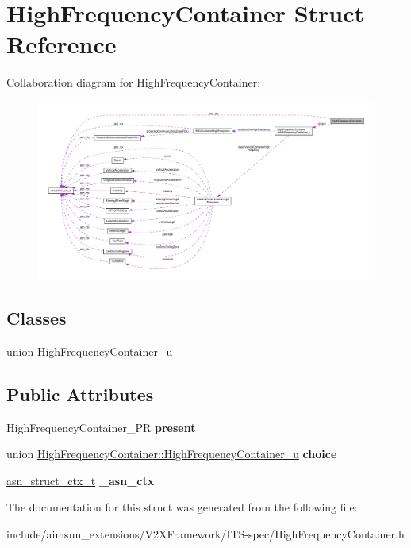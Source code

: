 \hypertarget{structHighFrequencyContainer}{}\section{High\+Frequency\+Container Struct Reference}
\label{structHighFrequencyContainer}


Collaboration diagram for High\+Frequency\+Container\+:\nopagebreak
\begin{figure}[H]
\begin{center}
\leavevmode
\includegraphics[width=350pt]{structHighFrequencyContainer__coll__graph}
\end{center}
\end{figure}
\subsection*{Classes}
\begin{DoxyCompactItemize}
\item 
union \hyperlink{unionHighFrequencyContainer_1_1HighFrequencyContainer__u}{High\+Frequency\+Container\+\_\+u}
\end{DoxyCompactItemize}
\subsection*{Public Attributes}
\begin{DoxyCompactItemize}
\item 
High\+Frequency\+Container\+\_\+\+PR {\bfseries present}\hypertarget{structHighFrequencyContainer_ab35711fed2e73729b8db6ff67d4d8174}{}\label{structHighFrequencyContainer_ab35711fed2e73729b8db6ff67d4d8174}

\item 
union \hyperlink{unionHighFrequencyContainer_1_1HighFrequencyContainer__u}{High\+Frequency\+Container\+::\+High\+Frequency\+Container\+\_\+u} {\bfseries choice}\hypertarget{structHighFrequencyContainer_a3a7eaa2ad0dce46808aad2d12301334a}{}\label{structHighFrequencyContainer_a3a7eaa2ad0dce46808aad2d12301334a}

\item 
\hyperlink{structasn__struct__ctx__s}{asn\+\_\+struct\+\_\+ctx\+\_\+t} {\bfseries \+\_\+asn\+\_\+ctx}\hypertarget{structHighFrequencyContainer_aae9e0363548d3485deffa09df278a3ec}{}\label{structHighFrequencyContainer_aae9e0363548d3485deffa09df278a3ec}

\end{DoxyCompactItemize}


The documentation for this struct was generated from the following file\+:\begin{DoxyCompactItemize}
\item 
include/aimsun\+\_\+extensions/\+V2\+X\+Framework/\+I\+T\+S-\/spec/High\+Frequency\+Container.\+h\end{DoxyCompactItemize}

